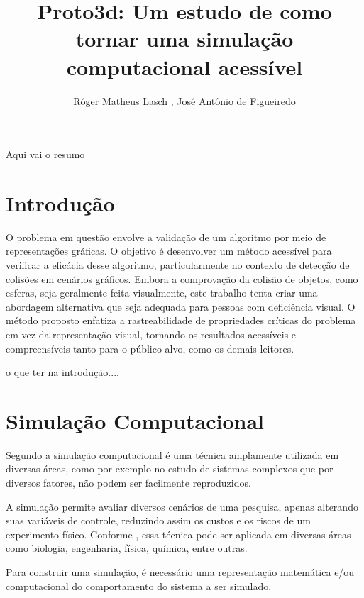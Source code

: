 \documentclass[12pt]{article}
\title{Proto3d: Um estudo de como tornar uma simulação computacional acessível}
\author{Róger Matheus Lasch \inst{1}, José Antônio de Figueiredo\inst{1}}
\begin{document}
 

\maketitle

\begin{abstract}
\end{abstract}
     
\begin{resumo} 
  Aqui vai o resumo
\end{resumo}

\section{Introdução}

O problema em questão envolve a validação de um algoritmo por meio de representações gráficas. O objetivo é desenvolver um método acessível para verificar a eficácia desse algoritmo, particularmente no contexto de detecção de colisões em cenários gráficos. Embora a comprovação da colisão de objetos, como esferas, seja geralmente feita visualmente, este trabalho tenta criar uma abordagem alternativa que seja adequada para pessoas com deficiência visual. O método proposto enfatiza a rastreabilidade de propriedades críticas do problema em vez da representação visual, tornando os resultados acessíveis e compreensíveis tanto para o público alvo, como os demais leitores.

o que ter na introdução....

\section{Simulação Computacional}

Segundo \cite{duran2018computer} a simulação computacional é uma técnica amplamente utilizada em diversas áreas, como por exemplo no estudo de sistemas complexos que por diversos fatores, não podem ser facilmente reproduzidos.

A simulação permite avaliar diversos cenários de uma pesquisa, apenas alterando suas variáveis de controle, reduzindo assim os custos e os riscos de um experimento físico. Conforme \cite{marschner2018}, essa técnica pode ser aplicada em diversas áreas como biologia, engenharia, física, química, entre outras.

Para construir uma simulação, é necessário uma representação matemática e/ou computacional do comportamento do sistema a ser simulado.
\end{document}
